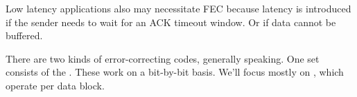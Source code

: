 \documentclass[11pt, oneside]{amsart}
\begin{document}
Low latency applications also may necessitate FEC because latency is
introduced if the sender needs to wait for an ACK timeout window. Or if
data cannot be buffered.

There are two kinds of error-correcting codes, generally speaking. One
set consists of the . These work on a
bit-by-bit basis. We'll focus mostly on , which
operate per data block.








\end{document}
